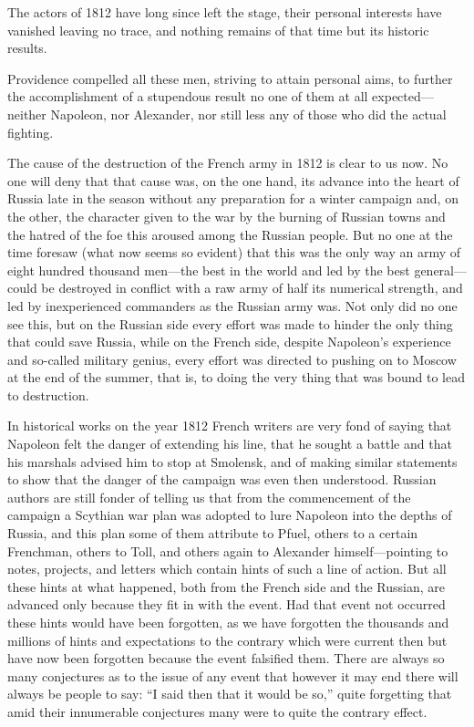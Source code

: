 The actors of 1812 have long since left the stage, their personal
interests have vanished leaving no trace, and nothing remains of
that time but its historic results.

Providence compelled all these men, striving to attain personal
aims, to further the accomplishment of a stupendous result no one
of them at all expected---neither Napoleon, nor Alexander, nor
still less any of those who did the actual fighting.

The cause of the destruction of the French army in 1812 is clear
to us now. No one will deny that that cause was, on the one hand,
its advance into the heart of Russia late in the season without
any preparation for a winter campaign and, on the other, the
character given to the war by the burning of Russian towns and
the hatred of the foe this aroused among the Russian people. But
no one at the time foresaw (what now seems so evident) that this
was the only way an army of eight hundred thousand men---the best
in the world and led by the best general---could be destroyed in
conflict with a raw army of half its numerical strength, and led
by inexperienced commanders as the Russian army was. Not only did
no one see this, but on the Russian side every effort was made to
hinder the only thing that could save Russia, while on the French
side, despite Napoleon's experience and so-called military
genius, every effort was directed to pushing on to Moscow at the
end of the summer, that is, to doing the very thing that was
bound to lead to destruction.

In historical works on the year 1812 French writers are very fond
of saying that Napoleon felt the danger of extending his line,
that he sought a battle and that his marshals advised him to stop
at Smolensk, and of making similar statements to show that the
danger of the campaign was even then understood. Russian authors
are still fonder of telling us that from the commencement of the
campaign a Scythian war plan was adopted to lure Napoleon into
the depths of Russia, and this plan some of them attribute to
Pfuel, others to a certain Frenchman, others to Toll, and others
again to Alexander himself---pointing to notes, projects, and
letters which contain hints of such a line of action. But all
these hints at what happened, both from the French side and the
Russian, are advanced only because they fit in with the
event. Had that event not occurred these hints would have been
forgotten, as we have forgotten the thousands and millions of
hints and expectations to the contrary which were current then
but have now been forgotten because the event falsified
them. There are always so many conjectures as to the issue of any
event that however it may end there will always be people to say:
``I said then that it would be so,'' quite forgetting that amid
their innumerable conjectures many were to quite the contrary
effect.

